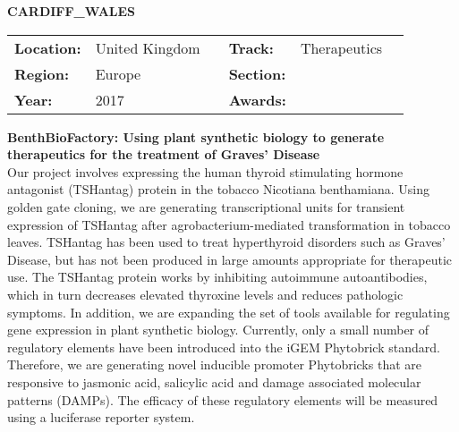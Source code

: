 \textbf{\uppercase{Cardiff\_Wales}}
\FloatBarrier
\begin{table}[h]
\begin{tabular}{lp{2.5cm}llll}
\textbf{Location:} & United Kingdom & \multicolumn{1}{|l}{} & \textbf{Track:}   & Therapeutics \\
\textbf{Region:}   & Europe   & \multicolumn{1}{|l}{} & \textbf{Section:} &  \\
\textbf{Year:}     & 2017   & \multicolumn{1}{|l}{} & \textbf{Awards:}  &
\end{tabular}
\end{table}
\FloatBarrier
\noindent	\textbf{BenthBioFactory: Using plant synthetic biology to generate therapeutics for the treatment of Graves’ Disease} \vspace{.2cm}\\
Our project involves expressing the human thyroid stimulating hormone antagonist (TSHantag) protein in the tobacco Nicotiana benthamiana. Using golden gate cloning, we are generating transcriptional units for transient expression of TSHantag after agrobacterium-mediated transformation in tobacco leaves. TSHantag has been used to treat hyperthyroid disorders such as Graves’ Disease, but has not been produced in large amounts appropriate for therapeutic use. The TSHantag protein works by inhibiting autoimmune autoantibodies, which in turn decreases elevated thyroxine levels and reduces pathologic symptoms. 
In addition, we are expanding the set of tools available for regulating gene expression in plant synthetic biology. Currently, only a small number of regulatory elements have been introduced into the iGEM Phytobrick standard. Therefore, we are generating novel inducible promoter Phytobricks that are responsive to jasmonic acid, salicylic acid and damage associated molecular patterns (DAMPs). The efficacy of these regulatory elements will be measured using a luciferase reporter system. 
\vspace{2cm}

